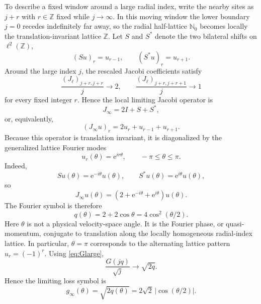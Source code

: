 \documentclass[11pt]{article}
\numberwithin{equation}{section}
\newcommand{\e}{\mathrm e}
\theoremstyle{definition}
\begin{document}
To describe a fixed window around a large radial index, write the nearby sites
as $j+r$ with $r\in\mathbb Z$ fixed while $j\to\infty$.  In this moving
window the lower boundary $j=0$ recedes indefinitely far away, so the radial
half-lattice $\mathbb N_0$ becomes locally the translation-invariant lattice
$\mathbb Z$.  Let $S$ and $S^\ast$ denote the two bilateral shifts on
$\ell^2(\mathbb Z)$,
\begin{equation}
 (Su)_r=u_{r-1},
 \qquad
 (S^\ast u)_r=u_{r+1}.
 \label{eq:bilateral_shifts}
\end{equation}
Around the large index $j$, the rescaled Jacobi coefficients satisfy
\begin{equation}
 \frac{(J_\ell)_{j+r,j+r}}{j}\to2,
 \qquad
 \frac{(J_\ell)_{j+r,j+r+1}}{j}\to1
\end{equation}
for every fixed integer $r$.  Hence the local limiting Jacobi operator is
\begin{equation}
 J_\infty=2I+S+S^\ast,
 \label{eq:Jinf}
\end{equation}
or, equivalently,
\begin{equation}
 (J_\infty u)_r=2u_r+u_{r-1}+u_{r+1}.
\end{equation}
Because this operator is translation invariant, it is diagonalized by the
generalized lattice Fourier modes
\begin{equation}
 u_r(\theta)=\e^{ir\theta},
 \qquad -\pi\le\theta\le\pi.
\end{equation}
Indeed,
\begin{equation}
 Su(\theta)=\e^{-i\theta}u(\theta),
 \qquad
 S^\ast u(\theta)=\e^{i\theta}u(\theta),
\end{equation}
so
\begin{equation}
 J_\infty u(\theta)
 =\left(2+\e^{-i\theta}+\e^{i\theta}\right)u(\theta).
\end{equation}
The Fourier symbol is therefore
\begin{equation}
 q(\theta)=2+2\cos\theta
 =4\cos^2(\theta/2).
 \label{eq:qtheta}
\end{equation}
Here $\theta$ is not a physical velocity-space angle.  It is the Fourier phase,
or quasi-momentum, conjugate to translation along the locally homogeneous
radial-index lattice.  In particular, $\theta=\pi$ corresponds to the
alternating lattice pattern $u_r=(-1)^r$.
Using \eqref{eq:Glarge},
\begin{equation}
 \frac{G(jq)}{\sqrt j}
 \longrightarrow
 \sqrt{2q}.
\end{equation}
Hence the limiting loss symbol is
\begin{equation}
 g_\infty(\theta)
 =
 \sqrt{2q(\theta)}
 =
 2\sqrt2\,|\cos(\theta/2)|.
 \label{eq:ginf}
\end{equation}
\end{document}
